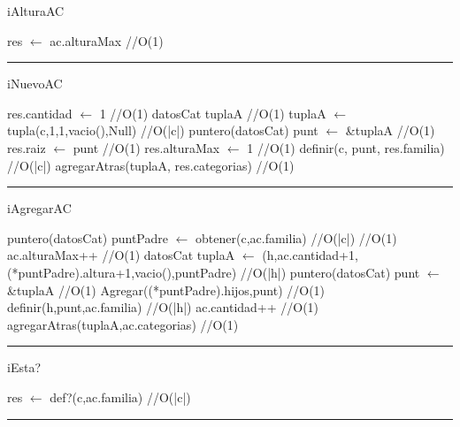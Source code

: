 \begin{algorithm}[H]
\caption{iAlturaAC}
\begin{algorithmic}[1]
\state res $\gets$ ac.alturaMax \hfill //O(1)
\EndFunction 
\end{algorithmic}
\hrule
{}
\end{algorithm}

\begin{algorithm}[H]
\caption{iNuevoAC}
\begin{algorithmic}[1]
\state res.cantidad $\gets$ 1 \hfill //O(1)
\state datosCat tuplaA \hfill //O(1)
\state tuplaA $\gets$ tupla(c,1,1,vacio(),Null) \hfill //O(|c|)
\state puntero(datosCat) punt $\gets$ \&tuplaA \hfill //O(1)
\state res.raiz $\gets$ punt \hfill //O(1)
\state res.alturaMax $\gets$ 1 \hfill //O(1)
\state definir(c, punt, res.familia) \hfill //O(|c|)
\state agregarAtras(tuplaA, res.categorias) \hfill //O(1)
\EndFunction 
\end{algorithmic}
\hrule
{}
\end{algorithm}

\begin{algorithm}[H]
\caption{iAgregarAC}
\begin{algorithmic}[1]
\state puntero(datosCat) puntPadre $\gets$ obtener(c,ac.familia) \hfill //O(|c|)
 \hfill //O(1)
\state ac.alturaMax++ \hfill //O(1)
\endif
\state datosCat tuplaA $\gets$ (h,ac.cantidad+1,(*puntPadre).altura+1,vacio(),puntPadre) \hfill //O(|h|)
\state puntero(datosCat) punt $\gets$ \&tuplaA \hfill //O(1)
\state Agregar((*puntPadre).hijos,punt) \hfill //O(1)
\state definir(h,punt,ac.familia) \hfill //O(|h|)
\state ac.cantidad++ \hfill //O(1)
\state agregarAtras(tuplaA,ac.categorias) \hfill //O(1)
\EndFunction 
\end{algorithmic}
\hrule
{}
\end{algorithm}

\begin{algorithm}[H]
\caption{iEsta?}
\begin{algorithmic}[1]
\state res $\gets$ def?(c,ac.familia) \hfill //O(|c|)
\EndFunction 
\end{algorithmic}
\hrule
{}
\end{algorithm}

